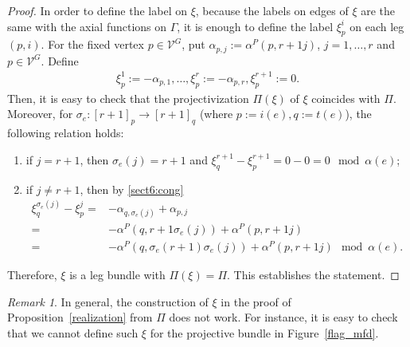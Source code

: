 \documentclass[12pt]{amsart}
\theoremstyle{definition}
\theoremstyle{remark}
\newtheorem{remark}[theorem]{Remark}
\numberwithin{equation}{section}
\begin{document}
\begin{proof}
In order to define the label on $\xi$,
because the labels on edges of $\xi$ are the same with the axial functions on $\Gamma$, it is enough to define the label $\xi_{p}^{i}$ on each leg $(p,i)$.
For the fixed vertex $p\in \mathcal{V}^{G}$, put $\alpha_{p,j}:=\alpha^{P}(p,r+1j)$, $j=1,\ldots ,r$ and $p\in \mathcal{V}^{G}$.
Define
\begin{align*}
\xi_{p}^{1}:=-\alpha_{p,1},\ldots , \xi_{p}^{r}:=-\alpha_{p,r}, \xi_{p}^{r+1}:=0.
\end{align*}
Then, it is easy to check that the projectivization $\Pi(\xi)$ of $\xi$ coincides with $\Pi$.
Moreover, for $\sigma_{e}:[r+1]_{p}\to [r+1]_{q}$ (where $p:=i(e), q:=t(e)$),
the following relation holds:
\begin{enumerate}
\item if $j=r+1$, then $\sigma_{e}(j)=r+1$ and $\xi_{q}^{r+1}-\xi_{p}^{r+1}=0-0=0 \mod \alpha(e)$;
\item if $j\not=r+1$, then by \eqref{sect6:cong}
\begin{align*}
\xi_{q}^{\sigma_{e}(j)}-\xi_{p}^{j}=&-\alpha_{q,\sigma_{e}(j)}+\alpha_{p,j} \\
=&-\alpha^{P}(q,r+1\sigma_{e}(j))+\alpha^{P}(p,r+1j) \\
=&-\alpha^{P}(q,\sigma_{e}(r+1)\sigma_{e}(j))+\alpha^{P}(p,r+1j) \mod \alpha(e).
\end{align*}
\end{enumerate}
Therefore, $\xi$ is a leg bundle with $\Pi(\xi)=\Pi$.
This establishes the statement.
\end{proof}

\begin{remark}
In general, the construction of $\xi$ in the proof of Proposition~\ref{realization} from $\Pi$ does not work.
For instance, it is easy to check that we cannot define such $\xi$ for the projective bundle in Figure~\ref{flag_mfd}.
\end{remark}
\end{document}
